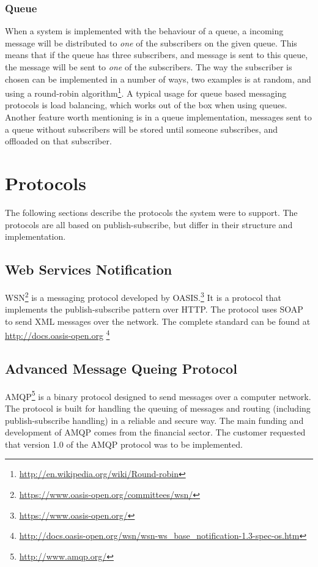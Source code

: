 \subsubsection{Queue}
When a system is implemented with the behaviour of a queue, a incoming message will be distributed to \textit{one} of the subscribers on the given queue. This means that if the queue has three subscribers, and message is sent to this queue, the message will be sent to \textit{one} of the subscribers. The way the subscriber is chosen can be implemented in a number of ways, two examples is at random, and using a round-robin algorithm\footnote{\url{http://en.wikipedia.org/wiki/Round-robin}}. A typical usage for queue based messaging  protocols is load balancing, which works out of the box when using queues. Another feature worth mentioning is in a queue implementation, messages sent to a queue without subscribers will be stored until someone subscribes, and offloaded on that subscriber.

\section{Protocols}
\label{prestudies-protocols}

The following sections describe the protocols the system were to support. The protocols are all based on publish-subscribe, but differ in their structure and implementation.

\subsection{Web Services Notification}
\label{subsec:prestudies-wsnotification}

WSN\footnote{\url{https://www.oasis-open.org/committees/wsn/}} is a messaging protocol developed by OASIS.\footnote{\url{https://www.oasis-open.org/}} It is a protocol that implements the publish-subscribe pattern over HTTP. The protocol uses SOAP to send XML messages over the network. The complete standard can be found at \url{http://docs.oasis-open.org} \footnote{\url{http://docs.oasis-open.org/wsn/wsn-ws_base_notification-1.3-spec-os.htm}}

\subsection{Advanced Message Queing Protocol}
\label{subsec:prestudies-amqp}
AMQP\footnote{\url{http://www.amqp.org/}} is a binary protocol designed to send messages over a computer network. The protocol is built for handling the queuing of messages and routing (including publish-subscribe handling) in a reliable and secure way. The main funding and development of AMQP comes from the financial sector. The customer requested that version 1.0 of the AMQP protocol was to be implemented.

